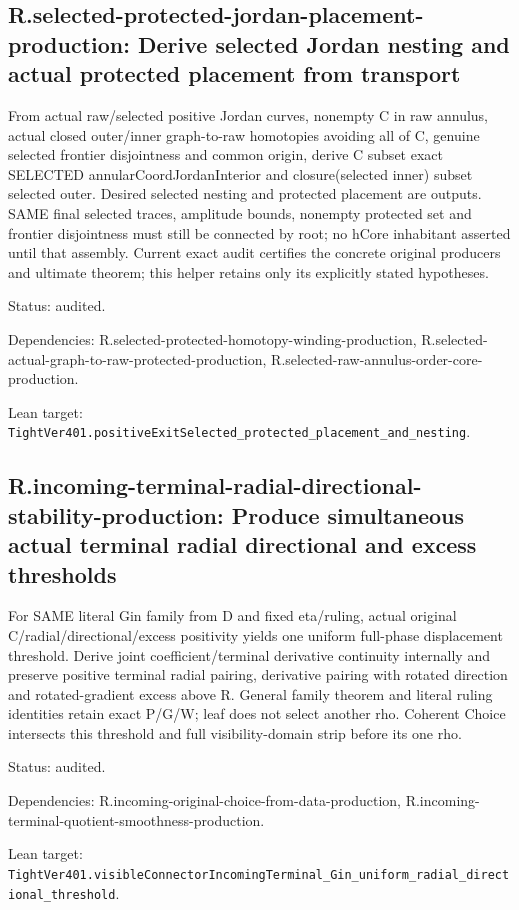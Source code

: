 \documentclass{article}
\begin{document}
\subsection*{R.selected-protected-jordan-placement-production: Derive selected Jordan nesting and actual protected placement from transport}
From actual raw/selected positive Jordan curves, nonempty C in raw annulus, actual closed outer/inner graph-to-raw homotopies avoiding all of C, genuine selected frontier disjointness and common origin, derive C subset exact SELECTED annularCoordJordanInterior and closure(selected inner) subset selected outer. Desired selected nesting and protected placement are outputs. SAME final selected traces, amplitude bounds, nonempty protected set and frontier disjointness must still be connected by root; no hCore inhabitant asserted until that assembly. Current exact audit certifies the concrete original producers and ultimate theorem; this helper retains only its explicitly stated hypotheses.
\par Status: audited.
\par Dependencies: R.selected-protected-homotopy-winding-production, R.selected-actual-graph-to-raw-protected-production, R.selected-raw-annulus-order-core-production.
\par Lean target: \texttt{TightVer401.positiveExitSelected\_protected\_placement\_and\_nesting}.
\subsection*{R.incoming-terminal-radial-directional-stability-production: Produce simultaneous actual terminal radial directional and excess thresholds}
For SAME literal Gin family from D and fixed eta/ruling, actual original C/radial/directional/excess positivity yields one uniform full-phase displacement threshold. Derive joint coefficient/terminal derivative continuity internally and preserve positive terminal radial pairing, derivative pairing with rotated direction and rotated-gradient excess above R. General family theorem and literal ruling identities retain exact P/G/W; leaf does not select another rho. Coherent Choice intersects this threshold and full visibility-domain strip before its one rho.
\par Status: audited.
\par Dependencies: R.incoming-original-choice-from-data-production, R.incoming-terminal-quotient-smoothness-production.
\par Lean target: \texttt{TightVer401.visibleConnectorIncomingTerminal\_Gin\_uniform\_radial\_directional\_threshold}.
\end{document}
